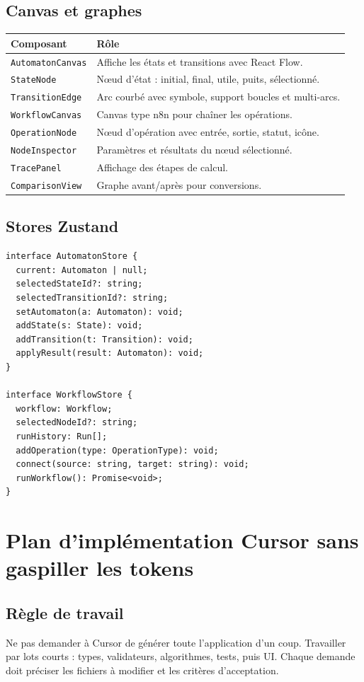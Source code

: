 \documentclass[11pt,a4paper]{report}
\newcommand{\code}[1]{\texttt{#1}}
\begin{document}
\section{Canvas et graphes}
\begin{longtable}{p{}p{}}
\toprule
\textbf{Composant} & \textbf{Rôle}\\
\midrule
\code{AutomatonCanvas} & Affiche les états et transitions avec React Flow.\\
\code{StateNode} & Nœud d'état : initial, final, utile, puits, sélectionné.\\
\code{TransitionEdge} & Arc courbé avec symbole, support boucles et multi-arcs.\\
\code{WorkflowCanvas} & Canvas type n8n pour chaîner les opérations.\\
\code{OperationNode} & Nœud d'opération avec entrée, sortie, statut, icône.\\
\code{NodeInspector} & Paramètres et résultats du nœud sélectionné.\\
\code{TracePanel} & Affichage des étapes de calcul.\\
\code{ComparisonView} & Graphe avant/après pour conversions.\\
\bottomrule
\end{longtable}

\section{Stores Zustand}
\begin{lstlisting}
interface AutomatonStore {
  current: Automaton | null;
  selectedStateId?: string;
  selectedTransitionId?: string;
  setAutomaton(a: Automaton): void;
  addState(s: State): void;
  addTransition(t: Transition): void;
  applyResult(result: Automaton): void;
}

interface WorkflowStore {
  workflow: Workflow;
  selectedNodeId?: string;
  runHistory: Run[];
  addOperation(type: OperationType): void;
  connect(source: string, target: string): void;
  runWorkflow(): Promise<void>;
}
\end{lstlisting}

\chapter{Plan d'implémentation Cursor sans gaspiller les tokens}

\section{Règle de travail}
\begin{decisionbox}
Ne pas demander à Cursor de générer toute l'application d'un coup. Travailler par lots courts : types, validateurs, algorithmes, tests, puis UI. Chaque demande doit préciser les fichiers à modifier et les critères d'acceptation.
\end{decisionbox}
\end{document}
